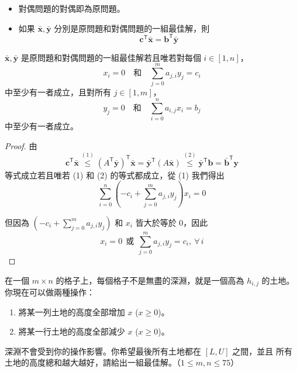 \documentclass[standalone]{beamer}
\begin{document}
\begin{frame}{}
  \begin{theorem}
    \begin{itemize}
    \item 對偶問題的對偶即為原問題。
    \item 如果 $\bar{\bm{x}}, \bar{\bm{y}}$ 分別是原問題和對偶問題的一組最佳解，則
      \[ \bm{c}^\mathsf{T} \bar{\bm{x}} = \bm{b}^\mathsf{T} \bar{\bm{y}} \]
    \end{itemize}
  \end{theorem}
\end{frame}

\begin{frame}{}
  \begin{theorem}
    $\bar{\bm{x}}, \bar{\bm{y}}$ 是原問題和對偶問題的一組最佳解若且唯若對每個 $i \in [1, n]$，
      \[
        x_i = 0 \quad \text{和} \quad \sum_{j=0}^m a_{j, i} y_j = c_i \label{eq:linear-programming-dual-slackness-1}
      \]
      中至少有一者成立，且對所有 $j \in [1, m]$，
      \[
        y_j = 0 \quad \text{和} \quad \sum_{i=0}^n a_{i, j} x_i = b_j \label{eq:linear-programming-dual-slackness-2}
      \]
      中至少有一者成立。
  \end{theorem}
\end{frame}

\begin{frame}{}
  \begin{proof}
    由
    \[
      \bm{c}^\mathsf{T} \bar{\bm{x}}
      \stackrel{(1)}{\leq} (A^\mathsf{T} \bar{\bm{y}})^\mathsf{T} \bar{\bm{x}}
      = \bar{\bm{y}}^\mathsf{T} (A \bar{\bm{x}})
      \stackrel{(2)}{\leq} \bar{\bm{y}}^\mathsf{T} \bm{b} = \bar{\bm{b}}^\mathsf{T} \bm{y}
    \]
    \pause
    等式成立若且唯若 (1) 和 (2) 的等式都成立，從 (1) 我們得出
    \[ \sum_{i = 0}^n \left( -c_i + \sum_{j = 0}^m a_{j, i} y_j \right) x_i = 0 \]
    \pause

    但因為 $\left( -c_i + \sum_{j = 0}^m a_{j, i} y_j \right)$ 和 $x_i$ 皆大於等於 $0$，因此
    \[ x_i = 0 \ \ \text{或}\ \ \sum_{j = 0}^m a_{j, i} y_j = c_i, \ \forall \, i \]
  \end{proof}
\end{frame}

\begin{frame}{}
  \begin{problem}
  在一個 $m \times n$ 的格子上，每個格子不是無盡的深淵，就是一個高為 $h_{i, j}$ 的土地。
  你現在可以做兩種操作： \pause

  \begin{enumerate}[<+->]
    \item 將某一列土地的高度全部增加 $x$ ($x \geq 0$)。
    \item 將某一行土地的高度全部減少 $x$ ($x \geq 0$)。
  \end{enumerate}

  \onslide<+->
  深淵不會受到你的操作影響。你希望最後所有土地都在 $[L, U]$ 之間，並且
  所有土地的高度總和越大越好，請給出一組最佳解。（$1 \leq m, n \leq 75$）
  \end{problem}
\end{frame}
\end{document}

